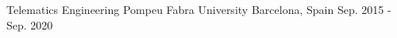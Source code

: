 


\begin{cventries}


\cventry
{Telematics Engineering} %
{Pompeu Fabra University} %
{Barcelona, Spain} %
{Sep. 2015 - Sep. 2020} %
{ %
\begin{cvitems}
\end{cvitems}
}


\end{cventries}